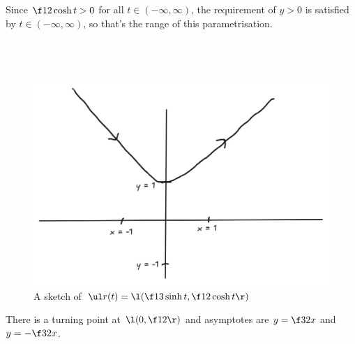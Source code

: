 \documentclass[a4paper]{article}
\begin{document}
Since $\f12 \cosh t > 0$ for all $t \in (-\infty, \infty)$, the requirement of $y>0$ is satisfied by $t \in (-\infty, \infty)$, so that's the range of this parametrisation.

\subsection{~}

\begin{figure}[h]
	\centering
	\includegraphics[scale=0.3]{Q2b}
	\caption{A sketch of $\ul r(t) = \l( \f13 \sinh t, \f12 \cosh t \r)$}
\end{figure}

There is a turning point at $\l(0, \f12\r)$ and asymptotes are $y = \f32 x$ and $y = -\f32 x$.

\subsection{~}



\subsection{~}
\end{document}
